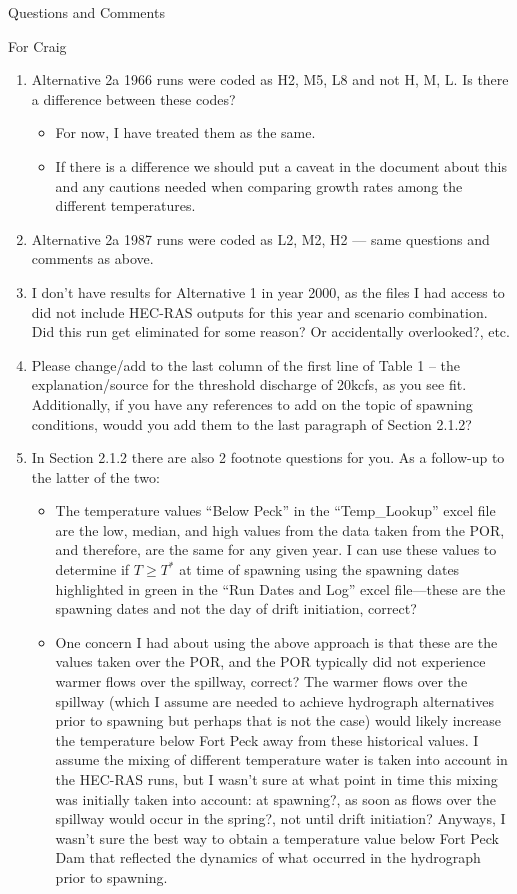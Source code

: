 \documentclass[12pt]{article}
\begin{document}
\begin{section}{Questions and Comments} 
\begin{subsection}{For Craig}
\begin{enumerate}
\item Alternative 2a 1966 runs were coded as H2, M5, L8 and not H, M, L.  Is there a difference between these codes?  
	\begin{itemize}
	\item For now, I have treated them as the same.  
	\item If there is a difference we should put a caveat in the document about this and any cautions needed when comparing growth rates among the different temperatures.
	\end{itemize}
\item Alternative 2a 1987 runs were coded as L2, M2, H2 --- same questions and comments as above. 
\item I don't have results for Alternative 1 in year 2000, as the files I had access to did not include HEC-RAS outputs for this year and scenario combination.  Did this run get eliminated for some reason? Or accidentally overlooked?, etc.
\item Please change/add to the last column of the first line of Table 1 -- the explanation/source for the threshold discharge of 20kcfs, as you see fit.  Additionally, if you have any references to add on the topic of spawning conditions, woudd you add them to the last paragraph of Section 2.1.2? 
\item In Section 2.1.2 there are also 2 footnote questions for you.  As a follow-up to the latter of the two:  
	\begin{itemize}
	\item The temperature values ``Below Peck'' in the ``Temp\_Lookup'' excel file are the low, median, and high values from the data taken from the POR, and therefore, are the same for any given year.  I can use these values to determine if $T\geq T^*$ at time of spawning using the spawning dates highlighted in green in the ``Run Dates and Log'' excel file---these are the spawning dates and not the day of drift initiation, correct?
	\item One concern I had about using the above approach is that these are the values taken over the POR, and the POR typically did not experience warmer flows over the spillway, correct?  The warmer flows over the spillway (which I assume are needed to achieve hydrograph alternatives prior to spawning but perhaps that is not the case) would likely increase the temperature below Fort Peck away from these historical values.  I assume the mixing of different temperature water is taken into account in the HEC-RAS runs, but I wasn't sure at what point in time this mixing was initially taken into account: at spawning?, as soon as flows over the spillway would occur in the spring?, not until drift initiation?  Anyways, I wasn't sure the best way to obtain a temperature value below Fort Peck Dam that reflected the dynamics of what occurred in the hydrograph prior to spawning.

\end{itemize}
\end{enumerate}
\end{subsection}
\end{section}
\end{document}
